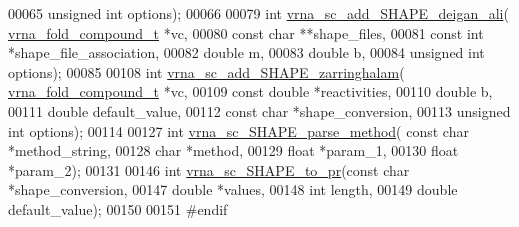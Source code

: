 \begin{DoxyCode}
00065                               \textcolor{keywordtype}{unsigned} \textcolor{keywordtype}{int} options);
00066 
00079 \textcolor{keywordtype}{int} \hyperlink{group__SHAPE__reactivities_ga04ba85da63d8c793bb8001d1e6f800ba}{vrna\_sc\_add\_SHAPE\_deigan\_ali}( 
      \hyperlink{group__fold__compound_structvrna__fc__s}{vrna\_fold\_compound\_t} *vc,
00080                                   \textcolor{keyword}{const} \textcolor{keywordtype}{char} **shape\_files,
00081                                   \textcolor{keyword}{const} \textcolor{keywordtype}{int} *shape\_file\_association,
00082                                   \textcolor{keywordtype}{double} m,
00083                                   \textcolor{keywordtype}{double} b,
00084                                   \textcolor{keywordtype}{unsigned} \textcolor{keywordtype}{int} options);
00085 
00108 \textcolor{keywordtype}{int} \hyperlink{group__SHAPE__reactivities_gaf3c65a045060aef5c4e41693d30af58c}{vrna\_sc\_add\_SHAPE\_zarringhalam}( 
      \hyperlink{group__fold__compound_structvrna__fc__s}{vrna\_fold\_compound\_t} *vc,
00109                                     \textcolor{keyword}{const} \textcolor{keywordtype}{double} *reactivities,
00110                                     \textcolor{keywordtype}{double} b,
00111                                     \textcolor{keywordtype}{double} default\_value,
00112                                     \textcolor{keyword}{const} \textcolor{keywordtype}{char} *shape\_conversion,
00113                                     \textcolor{keywordtype}{unsigned} \textcolor{keywordtype}{int} options);
00114 
00127 \textcolor{keywordtype}{int} \hyperlink{SHAPE_8h_a71b84eb0dd69e5c256f4ecf8f78cf314}{vrna\_sc\_SHAPE\_parse\_method}( \textcolor{keyword}{const} \textcolor{keywordtype}{char} *method\_string,
00128                                 \textcolor{keywordtype}{char} *method,
00129                                 \textcolor{keywordtype}{float} *param\_1,
00130                                 \textcolor{keywordtype}{float} *param\_2);
00131 
00146 \textcolor{keywordtype}{int} \hyperlink{group__SHAPE__reactivities_ga67675b3ed48744489a3bcfa4174197cb}{vrna\_sc\_SHAPE\_to\_pr}(\textcolor{keyword}{const} \textcolor{keywordtype}{char} *shape\_conversion,
00147                         \textcolor{keywordtype}{double} *values,
00148                         \textcolor{keywordtype}{int} length,
00149                         \textcolor{keywordtype}{double} default\_value);
00150 
00151 \textcolor{preprocessor}{#endif}
\end{DoxyCode}
